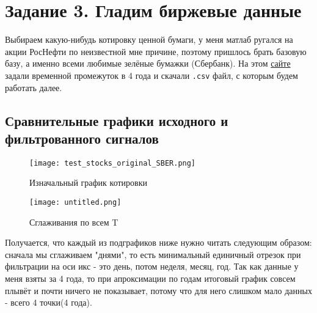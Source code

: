 \chapter{Задание 3. Гладим биржевые данные}
\label{ch:chap3}



\lstset{style=mystyle}

Выбираем какую-нибудь котировку ценной бумаги, у меня матлаб ругался на акции РосНефти по неизвестной мне причине, поэтому пришлось брать базовую базу, а именно всеми любимые зелёные бумажки (Сбербанк).
На этом \href{https://drive.google.com/drive/folders/1o8ozGv-bwYWuNpUlfYqM3rDu85QSQ0JW}{сайте} задали временной промежуток в 4 года и скачали \texttt{.csv} файл, с которым будем работать далее.

\section{Сравнительные графики исходного и фильтрованного сигналов}

\begin{figure}[ht]
    \centering
    \texttt{[image: test\_stocks\_original\_SBER.png]}
    \caption{Изначальный график котировки}
\end{figure}

\begin{figure}[ht]
    \centering
    \texttt{[image: untitled.png]}
    \caption{Сглаживания по всем T}
\end{figure}


Получается, что каждый из подграфиков ниже нужно читать следующим образом: сначала мы сглаживаем "днями", то есть минимальный единичный отрезок при фильтрации на оси икс - это день, потом неделя, месяц, год. 
Так как данные у меня взяты за 4 года, то при апроксимации по годам итоговый график совсем плывёт и почти ничего не показывает, потому что для него слишком мало данных - всего 4 точки(4 года).

\endinput